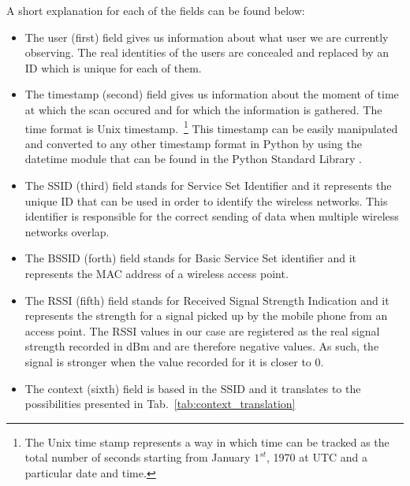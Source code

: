 A short explanation for each of the fields can be found below:
\begin{itemize}
\item The user (first) field gives us information about what user we are
currently observing. The real identities of the users are concealed and replaced by an ID
which is unique for each of them.
\item The timestamp (second) field gives us information about the moment of time
at which the scan occured and for which the information is gathered. The time
format is Unix timestamp.~\footnote{The Unix time stamp represents a way in
which time can be tracked as the total number of seconds starting from January
$1^{st}$, 1970 at UTC and a particular date and time.} This timestamp can be
easily manipulated and converted to any other timestamp format in Python by
using the datetime module that can be found in the Python Standard Library
\cite{PSL}.
\item The SSID (third) field stands for Service Set Identifier and it represents
the unique ID that can be used in order to identify the wireless networks. This
identifier is responsible for the correct sending of data when multiple wireless
networks overlap.
\item The BSSID (forth) field stands for Basic Service Set identifier and it
represents the MAC address of a wireless access point.
\item The RSSI (fifth) field stands for Received Signal Strength Indication and
it represents the strength for a signal picked up by the mobile phone from an
access point. The RSSI values in our case are registered as the real signal
strength recorded in dBm and are therefore negative values. As such, the signal
is stronger when the value recorded for it is closer to $0$.
\item The context (sixth) field is based in the SSID and it translates to the
possibilities presented in Tab.~\ref{tab:context_translation}
\end{itemize}

